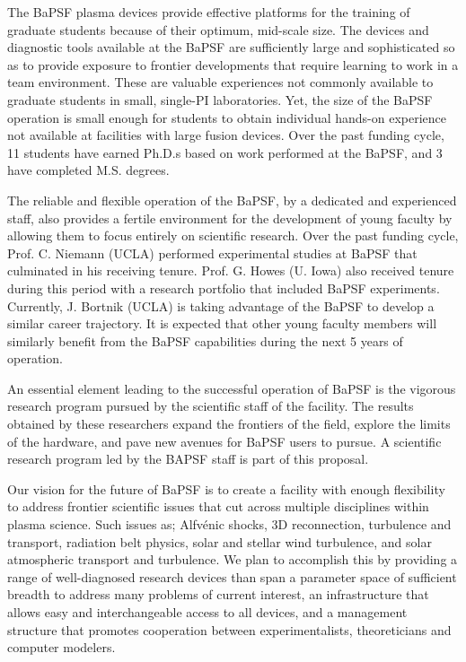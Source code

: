 \documentclass[11pt]{article}
\begin{document}
The BaPSF plasma devices provide effective platforms for the training
of graduate students because of their optimum, mid-scale size. The
devices and diagnostic tools available at the BaPSF are sufficiently
large and sophisticated so as to provide exposure to frontier
developments that require learning to work in a team
environment. These are valuable experiences not commonly available to
graduate students in small, single-PI laboratories. Yet, the size of
the BaPSF operation is small enough for students to obtain individual
hands-on experience not available at facilities with large fusion
devices. Over the past funding cycle, 11 students have earned Ph.D.s
based on work performed at the BaPSF, and 3 have completed
M.S. degrees.

The reliable and flexible operation of the BaPSF, by a dedicated and
experienced staff, also provides a fertile environment for the
development of young faculty by allowing them to focus entirely on
scientific research. Over the past funding cycle, Prof. C. Niemann
(UCLA) performed experimental studies at BaPSF that culminated in his
receiving tenure. Prof. G. Howes (U. Iowa) also received tenure during
this period with a research portfolio that included BaPSF experiments.
Currently, J. Bortnik (UCLA) is taking advantage of the BaPSF to develop
a similar career trajectory. It is expected that other young faculty
members will similarly benefit from the BaPSF capabilities during the
next 5 years of operation.

An essential element leading to the successful operation of BaPSF is the
vigorous research program pursued by the scientific staff of the
facility. The results obtained by these researchers expand the frontiers
of the field, explore the limits of the hardware, and pave new avenues
for BaPSF users to pursue. A scientific research program led by the BAPSF staff is part of
this proposal.  

Our vision for the future of BaPSF is to create a facility with enough
flexibility to address frontier scientific issues that cut across
multiple disciplines within plasma science. Such issues as; Alfvénic
shocks, 3D reconnection, turbulence and transport, radiation belt
physics, solar and stellar wind turbulence, and solar atmospheric
transport and turbulence. We plan to accomplish this by providing a
range of well-diagnosed research devices than span a parameter space
of sufficient breadth to address many problems of current interest, an
infrastructure that allows easy and interchangeable access to all
devices, and a management structure that promotes cooperation between
experimentalists, theoreticians and computer modelers.
\end{document}

